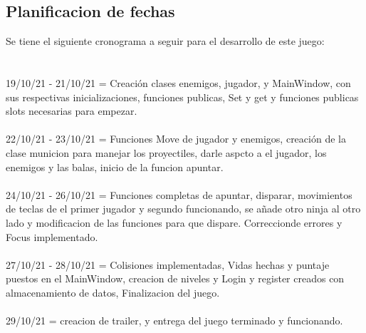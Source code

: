 \documentclass{article}
\begin{document}
\subsection{Planificacion de fechas}
Se tiene el siguiente cronograma a seguir para el desarrollo de este juego:\\\\\\
19/10/21 - 21/10/21 = Creación clases enemigos, jugador, y MainWindow, con sus respectivas inicializaciones, funciones publicas, Set y get y funciones publicas slots necesarias para empezar.\\\\
22/10/21 - 23/10/21 = Funciones Move de jugador y enemigos, creación de la clase municion para manejar los proyectiles, darle aspcto a el jugador, los enemigos y las balas, inicio de la funcion apuntar.\\\\
24/10/21 - 26/10/21 = Funciones completas de apuntar, disparar, movimientos de teclas de el primer jugador y segundo funcionando, se añade otro ninja al otro lado y modificacion de las funciones para que dispare. Correccionde errores y Focus implementado.\\\\
27/10/21 - 28/10/21 = Colisiones implementadas, Vidas hechas y puntaje puestos en el MainWindow, creacion de niveles y Login y register creados con almacenamiento de datos, Finalizacion del juego.\\\\
29/10/21 = creacion de trailer, y entrega del juego terminado y funcionando.\\\\ 
\end{document}
